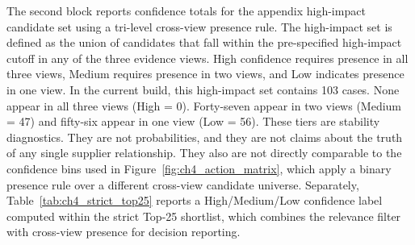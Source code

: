The second block reports confidence totals for the appendix high-impact candidate set using a tri-level cross-view presence rule. The high-impact set is defined as the union of candidates that fall within the pre-specified high-impact cutoff in any of the three evidence views. High confidence requires presence in all three views, Medium requires presence in two views, and Low indicates presence in one view. In the current build, this high-impact set contains 103 cases. None appear in all three views (High = 0). Forty-seven appear in two views (Medium = 47) and fifty-six appear in one view (Low = 56). These tiers are stability diagnostics. They are not probabilities, and they are not claims about the truth of any single supplier relationship. They also are not directly comparable to the confidence bins used in Figure~\ref{fig:ch4_action_matrix}, which apply a binary presence rule over a different cross-view candidate universe. Separately, Table~\ref{tab:ch4_strict_top25} reports a High/Medium/Low confidence label computed within the strict Top-25 shortlist, which combines the relevance filter with cross-view presence for decision reporting.

\begin{table}[tbp]
  \centering
  \caption[\textit{Cross-view stability summary across evidence views}]
  {\textit{Cross-view stability summary across evidence views}}
  \label{tab:app_c1_crossview_stability_summary}

  \footnotesize
  \setlength{\tabcolsep}{6pt}
  \renewcommand{\arraystretch}{1.04}

  

  \captionsetup{justification=raggedright,singlelinecheck=false}
  \caption*{\footnotesize \textit{Note}. ``Disclosed'' uses disclosed SCR ties; ``Empirical'' adds observed shipping; ``Augmented'' adds the predicted-layer expansion used for sensitivity analysis. Top-25 overlap reports the intersection size and Jaccard overlap of the view-specific Top-25 ranked nodes under the section's severity metric. Rank correlations are computed on the set of nodes common to both views (``common ranked nodes''). Dashes indicate not applicable. The ``Overall'' column reports totals for the appendix high-impact candidate set by confidence tier, where confidence is defined by cross-view presence (High = present in all three views, Medium = present in two views, Low = present in one view). These confidence tiers are diagnostic and are not directly comparable to the binary confidence bins used in Figure~\ref{fig:ch4_action_matrix}, which are computed over a different candidate universe.}
\end{table}


